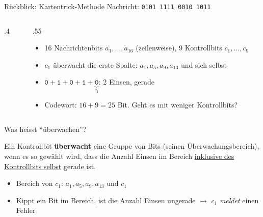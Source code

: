 \begin{frame}{Rückblick: Kartentrick-Methode}
    Nachricht: \texttt{0101 1111 0010 1011}
    \begin{columns}
        \begin{column}{.4\textwidth}
            \begin{center}
            \end{center}
        \end{column}
        \begin{column}{.55\textwidth}
            \begin{itemize}
                \item 16 Nachrichtenbits \(a_1, \ldots, a_{16}\) (zeilenweise), 9 Kontrollbits \(c_1, \ldots, c_9\)
                \item<2-> \(c_1\) überwacht die erste Spalte: \(a_1,a_5,a_9,a_{13}\) und sich selbst
                \item<2-> \(\texttt{0}+\texttt{1}+\texttt{0}+\texttt{1}+\underbrace{\texttt{0}}_{c_1}\): 2 Einsen, gerade
                \item<3-> Codewort: \(16+9=25\) Bit. Geht es mit weniger Kontrollbits?
            \end{itemize}
        \end{column}
    \end{columns}
\end{frame}


\begin{frame}{Was heisst \enquote{überwachen}?}
    \begin{mydefinition}
        Ein Kontrollbit \textbf{überwacht} eine Gruppe von Bits (seinen Überwachungsbereich), wenn es so gewählt wird, dass die Anzahl Einsen im Bereich \underline{inklusive des Kontrollbits selbst} gerade ist.
    \end{mydefinition}
    \begin{itemize}
        \item<2-> Bereich von \(c_1\): \(a_1,a_5,a_9,a_{13}\) und \(c_1\)
        \item<3-> Kippt ein Bit im Bereich, ist die Anzahl Einsen ungerade $\rightarrow$ \(c_1\) \emph{meldet} einen Fehler
    \end{itemize}
\end{frame}


